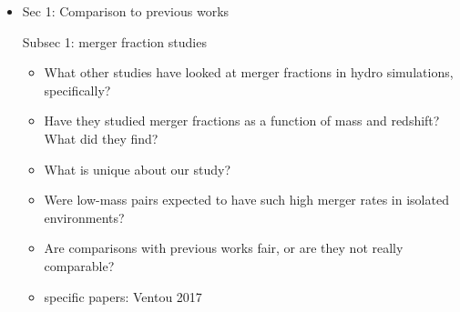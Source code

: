 \documentclass[twocolumn,linenumbers]{aastex631}
\begin{document}
\begin{itemize}
    \item Sec 1: Comparison to previous works 
    
    Subsec 1: merger fraction studies
    \begin{itemize} 
        \item What other studies have looked at merger fractions in hydro simulations, specifically? 
        \item Have they studied merger fractions as a function of mass and redshift? What did they find?
        \item What is unique about our study?
        \item Were low-mass pairs expected to have such high merger rates in isolated environments? 
        \item Are comparisons with previous works fair, or are they not really comparable?
        \item specific papers: Ventou 2017
    \end{itemize}


\end{itemize}
\end{document}
